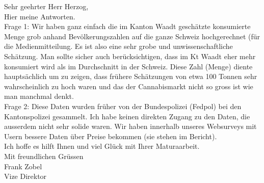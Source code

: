 \documentclass[../main.tex]{subfiles}
\begin{document}
	\begin{tcolorbox}[title=Frank Zobel $\to$ Thomas Herzog]
		\scriptsize Sehr geehrter Herr Herzog,\\

		Hier meine Antworten.\\

		Frage 1: Wir haben ganz einfach die im Kanton Waadt geschätzte konsumierte Menge grob anhand Bevölkerungszahlen auf die ganze Schweiz hochgerechnet (für die Medienmitteilung. Es ist also eine sehr grobe und unwissenschaftliche Schätzung. Man sollte sicher auch berücksichtigen, dass im Kt Waadt eher mehr konsumiert wird als im Durchschnitt in der Schweiz. Diese Zahl (Menge) diente hauptsächlich um zu zeigen, dass frühere Schätzungen von etwa 100 Tonnen sehr wahrscheinlich zu hoch waren und das der Cannabismarkt nicht so gross ist wie man manchmal denkt.\\

		Frage 2: Diese Daten wurden früher von der Bundespolizei (Fedpol) bei den Kantonspolizei gesammelt. Ich habe keinen direkten Zugang zu den Daten, die ausserdem nicht sehr solide waren. Wir haben innerhalb unseres Websurveys mit Usern bessere Daten über Preise bekommen (sie stehen im Bericht).\\

		Ich hoffe es hilft Ihnen und viel Glück mit Ihrer Maturaarbeit.\\

		Mit freundlichen Grüssen\\

		Frank Zobel\\
		Vize Direktor
	\end{tcolorbox}
\end{document}
